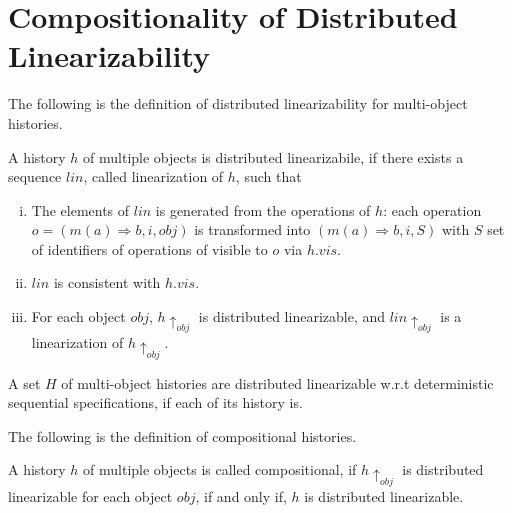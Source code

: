 
\section{Compositionality of Distributed Linearizability}
\label{sec:compositionality of distributed linearizability}


The following is the definition of distributed linearizability for multi-object histories.

\begin{definition}
\label{definition:distributed linearizability for multi-object histories}
A history $h$ of multiple objects is distributed linearizabile, if there exists a sequence $\mathit{lin}$, called linearization of $h$, such that

\begin{enumerate}[(i)]
\item The elements of $\mathit{lin}$ is generated from the operations of $h$: each operation $o = (m(a) \Rightarrow b,i,\mathit{obj})$ is transformed into $(m(a) \Rightarrow b,i,S)$ with $S$ set of identifiers of operations of visible to $o$ via $h.\mathit{vis}$.
\item $\mathit{lin}$ is consistent with $h. \mathit{vis}$.
\item For each object $\mathit{obj}$, $h \uparrow_{\mathit{obj}}$ is distributed linearizable, and $\mathit{lin} \uparrow_{ \mathit{obj} }$ is a linearization of $h \uparrow_{\mathit{obj}}$.
\end{enumerate}

A set $H$ of multi-object histories are distributed linearizable w.r.t deterministic sequential specifications, if each of its history is.
\end{definition}

The following is the definition of compositional histories.

\begin{definition}[Compositionality]
\label{definition:compositionality}
A history $h$ of multiple objects is called compositional, if $h \uparrow_{\mathit{obj}}$ is distributed linearizable for each object $\mathit{obj}$, if and only if, $h$ is distributed linearizable.
\end{definition}

